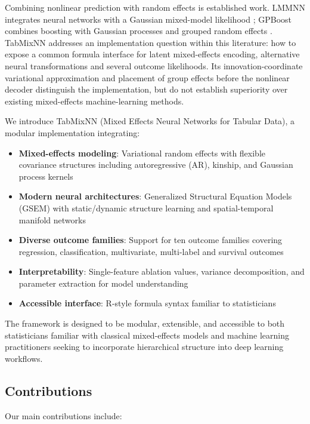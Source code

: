\documentclass[12pt,a4paper]{article}
\begin{document}
Combining nonlinear prediction with random effects is established work. LMMNN integrates neural networks with a Gaussian mixed-model likelihood \citep{simchoni2023integrating}; GPBoost combines boosting with Gaussian processes and grouped random effects \citep{sigrist2022gaussian}. TabMixNN addresses an implementation question within this literature: how to expose a common formula interface for latent mixed-effects encoding, alternative neural transformations and several outcome likelihoods. Its innovation-coordinate variational approximation and placement of group effects before the nonlinear decoder distinguish the implementation, but do not establish superiority over existing mixed-effects machine-learning methods.

We introduce TabMixNN (Mixed Effects Neural Networks for Tabular Data), a modular implementation integrating:

\begin{itemize}
    \item \textbf{Mixed-effects modeling}: Variational random effects with flexible covariance structures including autoregressive (AR), kinship, and Gaussian process kernels
    \item \textbf{Modern neural architectures}: Generalized Structural Equation Models (GSEM) with static/dynamic structure learning and spatial-temporal manifold networks
    \item \textbf{Diverse outcome families}: Support for ten outcome families covering regression, classification, multivariate, multi-label and survival outcomes
    \item \textbf{Interpretability}: Single-feature ablation values, variance decomposition, and parameter extraction for model understanding
    \item \textbf{Accessible interface}: R-style formula syntax familiar to statisticians
\end{itemize}

The framework is designed to be modular, extensible, and accessible to both statisticians familiar with classical mixed-effects models and machine learning practitioners seeking to incorporate hierarchical structure into deep learning workflows.

\subsection{Contributions}

Our main contributions include:
\end{document}
